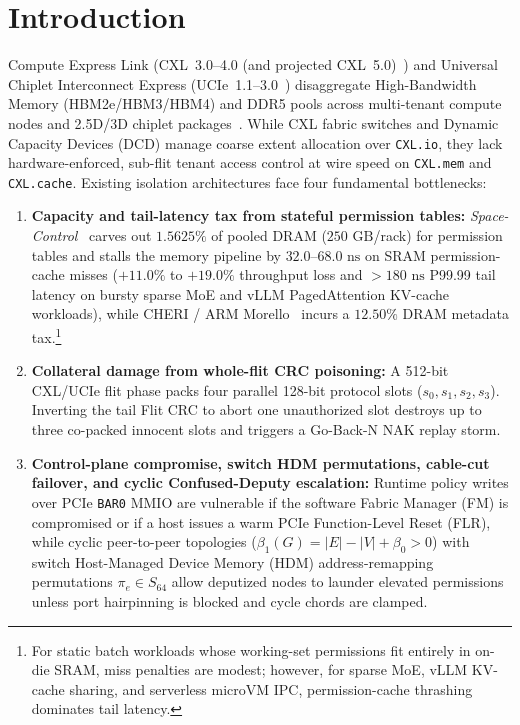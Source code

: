 \documentclass[10pt,twocolumn]{article}
\theoremstyle{spectralthm}
\begin{document}
\section{Introduction}
Compute Express Link (\mbox{CXL~3.0--4.0} (and projected \mbox{CXL~5.0})~\cite{cxl2025spec}) and Universal Chiplet Interconnect Express (\mbox{UCIe~1.1--3.0}~\cite{ucie2025spec30}) disaggregate High-Bandwidth Memory (HBM2e/HBM3/HBM4) and DDR5 pools across multi-tenant compute nodes and 2.5D/3D chiplet packages~\cite{goswami2026spacecontrol}. While CXL fabric switches and Dynamic Capacity Devices (DCD) manage coarse extent allocation over \texttt{CXL.io}, they lack hardware-enforced, sub-flit tenant access control at wire speed on \texttt{CXL.mem} and \texttt{CXL.cache}. Existing isolation architectures face four fundamental bottlenecks:
\begin{enumerate}
  \item \textbf{Capacity and tail-latency tax from stateful permission tables:} \textit{Space-Control}~\cite{goswami2026spacecontrol} carves out $1.5625\%$ of pooled DRAM ($250\text{~GB}$/rack) for permission tables and stalls the memory pipeline by $32.0$--$68.0\text{~ns}$ on SRAM permission-cache misses ($+11.0\%$ to $+19.0\%$ throughput loss and $>180\text{~ns}$ P99.99 tail latency on bursty sparse MoE and vLLM PagedAttention KV-cache workloads), while CHERI / ARM Morello~\cite{watson2015cheri} incurs a $12.50\%$ DRAM metadata tax.\footnote{For static batch workloads whose working-set permissions fit entirely in on-die SRAM, miss penalties are modest; however, for sparse MoE, vLLM KV-cache sharing, and serverless microVM IPC, permission-cache thrashing dominates tail latency.}
  \item \textbf{Collateral damage from whole-flit CRC poisoning:} A 512-bit CXL/UCIe flit phase packs four parallel 128-bit protocol slots ($s_0, s_1, s_2, s_3$). Inverting the tail Flit CRC to abort one unauthorized slot destroys up to three co-packed innocent slots and triggers a Go-Back-N NAK replay storm.
  \item \textbf{Control-plane compromise, switch HDM permutations, cable-cut failover, and cyclic Confused-Deputy escalation:} Runtime policy writes over PCIe \texttt{BAR0} MMIO are vulnerable if the software Fabric Manager (FM) is compromised or if a host issues a warm PCIe Function-Level Reset (FLR), while cyclic peer-to-peer topologies ($\beta_1(G) = |E| - |V| + \beta_0 > 0$) with switch Host-Managed Device Memory (HDM) address-remapping permutations $\pi_e \in S_{64}$ allow deputized nodes to launder elevated permissions unless port hairpinning is blocked and cycle chords are clamped.

\end{enumerate}
\end{document}
